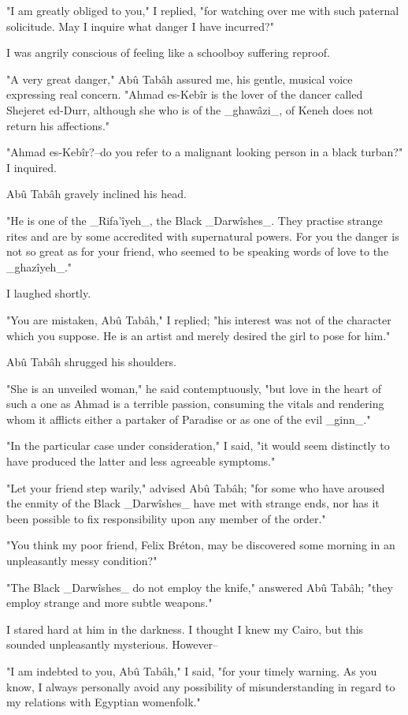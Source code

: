 "I am greatly obliged to you," I replied, "for watching over me with
such paternal solicitude. May I inquire what danger I have incurred?"

I was angrily conscious of feeling like a schoolboy suffering reproof.

"A very great danger," Abû Tabâh assured me, his gentle, musical voice
expressing real concern. "Ahmad es-Kebîr is the lover of the dancer
called Shejeret ed-Durr, although she who is of the _ghawâzi_, of
Keneh does not return his affections."

"Ahmad es-Kebîr?--do you refer to a malignant looking person in a
black turban?" I inquired.

Abû Tabâh gravely inclined his head.

"He is one of the _Rifa'îyeh_, the Black _Darwîshes_. They practise
strange rites and are by some accredited with supernatural powers. For
you the danger is not so great as for your friend, who seemed to be
speaking words of love to the _ghazîyeh_."

I laughed shortly.

"You are mistaken, Abû Tabâh," I replied; "his interest was not of the
character which you suppose. He is an artist and merely desired the
girl to pose for him."

Abû Tabâh shrugged his shoulders.

"She is an unveiled woman," he said contemptuously, "but love in the
heart of such a one as Ahmad is a terrible passion, consuming the
vitals and rendering whom it afflicts either a partaker of Paradise
or as one of the evil _ginn_."

"In the particular case under consideration," I said, "it would seem
distinctly to have produced the latter and less agreeable symptoms."

"Let your friend step warily," advised Abû Tabâh; "for some who have
aroused the enmity of the Black _Darwîshes_ have met with strange
ends, nor has it been possible to fix responsibility upon any member
of the order."

"You think my poor friend, Felix Bréton, may be discovered some
morning in an unpleasantly messy condition?"

"The Black _Darwîshes_ do not employ the knife," answered Abû Tabâh;
"they employ strange and more subtle weapons."

I stared hard at him in the darkness. I thought I knew my Cairo, but
this sounded unpleasantly mysterious. However--

"I am indebted to you, Abû Tabâh," I said, "for your timely warning.
As you know, I always personally avoid any possibility of
misunderstanding in regard to my relations with Egyptian womenfolk."

